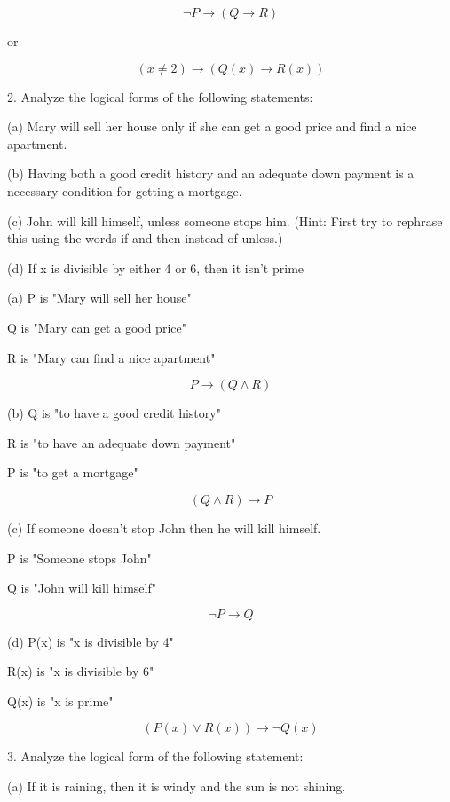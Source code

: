 \documentclass{article}
\begin{document}
$$\neg P \to (Q \to R)$$

or

$$(x \neq 2) \to (Q(x) \to R(x))$$

2. Analyze the logical forms of the following statements:

\hspace{12pt}(a) Mary will sell her house only if she can get a good price and find a
nice apartment.

\hspace{12pt}(b) Having both a good credit history and an adequate down payment is a
necessary condition for getting a mortgage.

\hspace{12pt}(c) John will kill himself, unless someone stops him. (Hint: First try to
rephrase this using the words if and then instead of unless.)

\hspace{12pt}(d) If x is divisible by either 4 or 6, then it isn't prime
\vspace{30pt}

(a) P is "Mary will sell her house"

Q is "Mary can get a good price"

R is "Mary can find a nice apartment"

$$P \to (Q \land R)$$
\vspace{20pt}

(b) Q is "to have a good credit history"

R is "to have an adequate down payment"

P is "to get a mortgage"

$$(Q \land R) \to P$$
\vspace{20pt}

(c) If someone doesn't stop John then he will kill himself.

P is "Someone stops John"

Q is "John will kill himself"

$$\neg P \to Q$$
\vspace{20pt}

(d) P(x) is "x is divisible by 4"

R(x) is "x is divisible by 6"

Q(x) is "x is prime"

$$(P(x) \lor R(x)) \to \neg Q(x)$$
\vspace{20pt}

3. Analyze the logical form of the following statement:

\hspace{12pt}(a) If it is raining, then it is windy and the sun is not shining.
\end{document}
